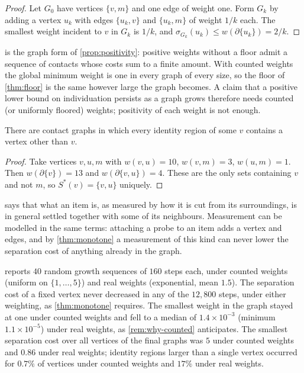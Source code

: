 \documentclass[10pt,twocolumn,a4paper]{article}
\newcommand{\med}{m}
\newcommand{\sep}{\sigma}
\newcommand{\cut}{\partial}
\begin{document}
\begin{proof}
Let $G_0$ have vertices $\{v,\med\}$ and one edge of weight one. Form
$G_k$ by adding a vertex $u_k$ with edges $\{u_k,v\}$ and $\{u_k,\med\}$ of
weight $1/k$ each. The smallest weight incident to $v$ in $G_k$ is $1/k$, and
$\sep_{G_k}(u_k)\le w(\cut\{u_k\})=2/k$.
\end{proof}

\begin{remark}
\label{rem:why-counted}
 is the graph form of \cref{prop:positivity}: positive
weights without a floor admit a sequence of contacts whose costs sum to a
finite amount. With counted weights the global minimum weight is one in every
graph of every size, so the floor of \cref{thm:floor} is the same however
large the graph becomes. A claim that a positive lower bound on individuation
persists as a graph grows therefore needs counted (or uniformly floored)
weights; positivity of each weight is not enough.
\end{remark}

\begin{proposition}
\label{prop:region}
There are contact graphs in which every identity region of some $v$ contains
a vertex other than $v$.
\end{proposition}

\begin{proof}
Take vertices $v,u,\med$ with $w(v,u)=10$, $w(v,\med)=3$, $w(u,\med)=1$. Then
$w(\cut\{v\})=13$ and $w(\cut\{v,u\})=4$. These are the only sets containing
$v$ and not $\med$, so $S^{*}(v)=\{v,u\}$ uniquely.
\end{proof}

 says that what an item is, as measured by how it is cut
from its surroundings, is in general settled together with some of its
neighbours. Measurement can be modelled in the same terms: attaching a probe
to an item adds a vertex and edges, and by \cref{thm:monotone} a measurement
of this kind can never lower the separation cost of anything already in the
graph.

 reports $40$ random growth sequences of $160$ steps
each, under counted weights (uniform on $\{1,\dots,5\}$) and real weights
(exponential, mean $1.5$). The separation cost of a fixed vertex never
decreased in any of the $12{,}800$ steps, under either weighting, as
\cref{thm:monotone} requires. The smallest weight in the graph stayed at one
under counted weights and fell to a median of $1.4\times10^{-3}$ (minimum
$1.1\times10^{-5}$) under real weights, as \cref{rem:why-counted} anticipates.
The smallest separation cost over all vertices of the final graphs was $5$
under counted weights and $0.86$ under real weights; identity regions larger
than a single vertex occurred for $0.7\%$ of vertices under counted weights
and $17\%$ under real weights.
\end{document}

